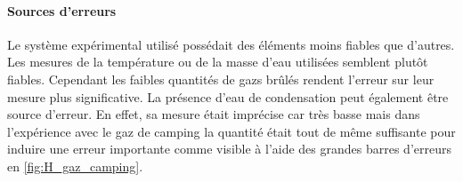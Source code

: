 \paragraph*{Sources d'erreurs}
Le système expérimental utilisé possédait des éléments moins fiables que d'autres. Les mesures de la température ou de la masse d'eau utilisées semblent plutôt fiables. Cependant les faibles quantités de gazs brûlés rendent l'erreur sur leur mesure plus significative. La présence d'eau de condensation peut également être source d'erreur. En effet, sa mesure était imprécise car très basse mais dans l'expérience avec le gaz de camping la quantité était tout de même suffisante pour induire une erreur importante comme visible à l'aide des grandes barres d'erreurs en \autoref{fig:H_gaz_camping}.
